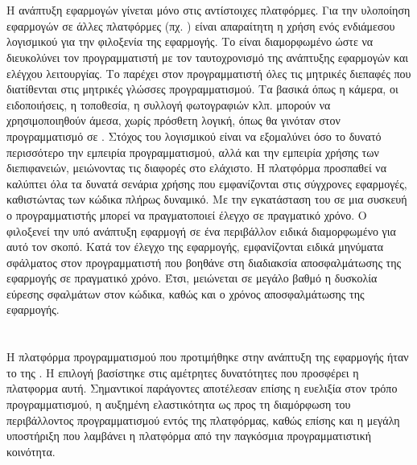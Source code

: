 \section{}
Η ανάπτυξη  εφαρμογών γίνεται μόνο στις αντίστοιχες  πλατφόρμες. Για την υλοποίηση εφαρμογών σε άλλες πλατφόρμες (πχ. ) είναι απαραίτητη η χρήση ενός ενδιάμεσου λογισμικού για την φιλοξενία της εφαρμογής. Το  είναι διαμορφωμένο ώστε να διευκολύνει τον προγραμματιστή με τον ταυτοχρονισμό της ανάπτυξης εφαρμογών και ελέγχου λειτουργίας.
\newline
\indent
Το  παρέχει στον προγραμματιστή όλες τις μητρικές διεπαφές που διατίθενται στις μητρικές γλώσσες προγραμματισμού. Τα βασικά  όπως η κάμερα, οι ειδοποιήσεις, η τοποθεσία, η συλλογή φωτογραφιών κλπ. μπορούν να χρησιμοποιηθούν άμεσα, χωρίς πρόσθετη λογική, όπως θα γινόταν στον προγραμματισμό σε . Στόχος του λογισμικού είναι να εξομαλύνει όσο το δυνατό περισσότερο την εμπειρία προγραμματισμού, αλλά και την εμπειρία χρήσης των διεπιφανειών, μειώνοντας τις διαφορές στο ελάχιστο. Η πλατφόρμα προσπαθεί να καλύπτει όλα τα δυνατά σενάρια χρήσης που εμφανίζονται στις σύγχρονες εφαρμογές, καθιστώντας των κώδικα πλήρως δυναμικό.
\newline
\indent
Με την εγκατάσταση του  σε μια συσκευή  ο προγραμματιστής μπορεί να πραγματοποιεί έλεγχο σε πραγματικό χρόνο. Ο  φιλοξενεί την υπό ανάπτυξη εφαρμογή σε ένα περιβάλλον ειδικά διαμορφωμένο για αυτό τον σκοπό. Κατά τον έλεγχο της εφαρμογής, εμφανίζονται ειδικά μηνύματα σφάλματος στον προγραμματιστή που βοηθάνε στη διαδιακσία αποσφαλμάτωσης της εφαρμογής σε πραγματικό χρόνο. Έτσι, μειώνεται σε μεγάλο βαθμό η δυσκολία εύρεσης σφαλμάτων στον κώδικα, καθώς και ο χρόνος αποσφαλμάτωσης της εφαρμογής.


\section{}

Η πλατφόρμα προγραμματισμού που προτιμήθηκε στην ανάπτυξη της εφαρμογής ήταν το  της . Η επιλογή βασίστηκε στις αμέτρητες δυνατότητες που προσφέρει η πλατφορμα αυτή. Σημαντικοί παράγοντες αποτέλεσαν επίσης η ευελιξία στον τρόπο προγραμματισμού, η αυξημένη ελαστικότητα ως προς τη διαμόρφωση του περιβάλλοντος προγραμματισμού εντός της πλατφόρμας, καθώς επίσης και η μεγάλη υποστήριξη που λαμβάνει η πλατφόρμα από την παγκόσμια προγραμματιστική κοινότητα.
